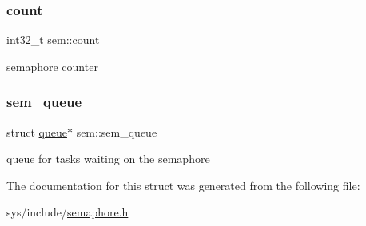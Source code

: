\subsubsection{\texorpdfstring{count}{count}}
{\footnotesize\ttfamily int32\+\_\+t sem\+::count}

semaphore counter \mbox{\label{structsem_a723ac960b2566b855b905fa4aa324f9b}} 
\subsubsection{\texorpdfstring{sem\+\_\+queue}{sem\_queue}}
{\footnotesize\ttfamily struct \hyperlink{structqueue}{queue}$\ast$ sem\+::sem\+\_\+queue}

queue for tasks waiting on the semaphore 

The documentation for this struct was generated from the following file\+:\begin{DoxyCompactItemize}
\item 
sys/include/\hyperlink{semaphore_8h}{semaphore.\+h}\end{DoxyCompactItemize}
